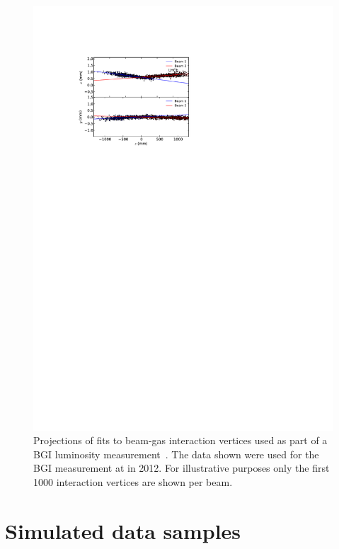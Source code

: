 \begin{figure}
  \centering
  \includegraphics[width=\textwidth]{figures/production/bgi_fits}
  \caption{%
    Projections of fits to beam-gas interaction vertices used as part of a 
    \acl{BGI} luminosity measurement~\cite{LHCb-PAPER-2014-047}.
    The data shown were used for the \ac{BGI} measurement at  in 
    2012.
    For illustrative purposes only the first \num{1000} interaction vertices 
    are shown per beam.
  }
  \label{fig:prod:data:lumi:bgi_fits}
\end{figure}

\section{Simulated data samples}
\label{chap:prod:data:mc}

